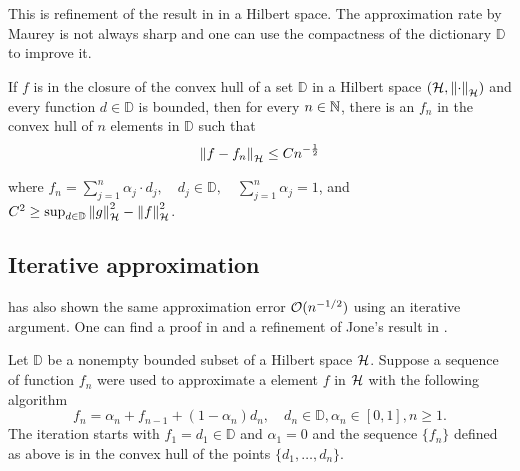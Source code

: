 \begin{remark}
    This is refinement of the result in \cite{pisierRemarquesResultatNon1980} in
    a Hilbert space. The approximation rate by Maurey is not always sharp and
    one can use the compactness of the dictionary $\mathbb{D}$ to improve it.
\end{remark}

\begin{corollary}
    \label{cor:maurey}
    If $f$ is in the closure of the convex hull of a set $\mathbb{D}$ in a
    Hilbert space $(\mathcal{H}, \left\| \cdot \right\|_{\mathcal{H}})$ and every function $d
    \in \mathbb{D}$ is bounded, then for every $n \in \mathbb{N}$, there is an $f_n$
    in the convex hull of $n$ elements in $\mathbb{D}$ such that
    \begin{equation}
        \left\| f - f_n \right\|_{\mathcal{H}}\leq C n^{-\frac{1}{2}}
    \end{equation}

    where $f_n = \sum_{j=1}^n \alpha_j \cdot d_j, \quad d_j \in \mathbb{D},
    \quad \sum_{j=1}^n \alpha_j = 1$, and $C^2 \geq \sup_{d\in \mathbb{D}}
    \left\| g \right\|_{\mathcal{H}}^2 - \left\| f \right\|_{\mathcal{H}}^2$.

\end{corollary}

\subsection{Iterative approximation}
\label{subsec:iterative}

\cite{jonesSimpleLemmaGreedy1992} has also shown the same approximation error
$\mathcal{O}(n^{-1/2})$ using an iterative argument. One can find a proof in
\cite[p. 611]{jonesSimpleLemmaGreedy1992} and a refinement of Jone's result in
\cite[Theorem 5]{barronUniversalApproximationBounds1993}. 

Let $\mathbb{D}$ be a nonempty bounded subset of a Hilbert space $\mathcal{H}$.
Suppose a sequence of function $f_n$ were used to approximate a element $f$ in
$\mathcal{H}$ with the following algorithm
\begin{equation}
    \label{eq:seq_appro_jones}
    f_n = \alpha_n + f_{n-1} + (1-\alpha_n) d_n, \quad
    d_n \in \mathbb{D}, \alpha_n \in [0,1], n \geq 1.
\end{equation}
The iteration starts with $f_1 = d_1 \in \mathbb{D}$ and $\alpha_1 = 0$ and the
sequence $\{f_n\}$ defined as above is in the convex hull of the points
$\{d_1,\dots, d_n\}$.

